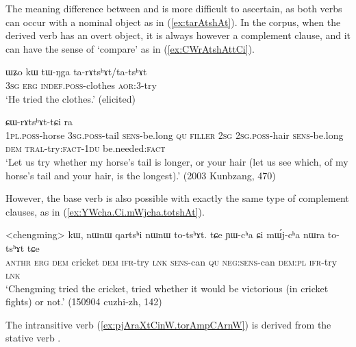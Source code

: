 The meaning difference between  and  is more difficult to ascertain, as both verbs can occur with a nominal object as in (\ref{ex:tarAtshAt}). In the corpus, when the derived verb  has an overt object, it is always however a complement clause, and it can have the sense of `compare' as in (\ref{ex:CWrAtshAttCi}).

\begin{exe}
\ex \label{ex:tarAtshAt}
\gll ɯʑo kɯ tɯ-ŋga ta-rɤtsʰɤt/ta-tsʰɤt \\
\textsc{3sg} \textsc{erg} \textsc{indef}.\textsc{poss}-clothes \textsc{aor}:3\flobv{}-try \\
\glt `He tried the clothes.' (elicited)
\end{exe}

\begin{exe}
\ex \label{ex:CWrAtshAttCi}
 ɕɯ-rɤtsʰɤt-tɕi ra \\
\textsc{1pl}.\textsc{poss}-horse \textsc{3sg}.\textsc{poss}-tail \textsc{sens}-be.long \textsc{qu} \textsc{filler} \textsc{2sg} \textsc{2sg}.\textsc{poss}-hair \textsc{sens}-be.long \textsc{dem} \textsc{tral}-try:\textsc{fact}-\textsc{1du} be.needed:\textsc{fact} \\
\glt `Let us try whether my horse's tail is longer, or your hair (let us see which, of my horse's tail and your hair, is the longest).' (2003 Kunbzang, 470)
\end{exe}

However, the base verb is also possible with exactly the same type of complement clauses, as in (\ref{ex:YWcha.Ci.mWjcha.totshAt}).

\begin{exe}
\ex \label{ex:YWcha.Ci.mWjcha.totshAt}
\gll <chengming> kɯ, nɯnɯ qartsʰi nɯnɯ to-tsʰɤt. tɕe ɲɯ-cʰa ɕi mɯ́j-cʰa nɯra to-tsʰɤt tɕe  \\
\textsc{anthr} \textsc{erg} \textsc{dem} cricket \textsc{dem} \textsc{ifr}-try \textsc{lnk} \textsc{sens}-can \textsc{qu} \textsc{neg}:\textsc{sens}-can \textsc{dem}:\textsc{pl} \textsc{ifr}-try \textsc{lnk} \\
\glt `Chengming tried the cricket, tried whether it would be victorious (in cricket fights) or not.'  (150904 cuzhi-zh, 142)
\end{exe}
 
The intransitive verb  (\ref{ex:pjAraXtCinW.torAmpCArnW}) is derived from the stative verb .

